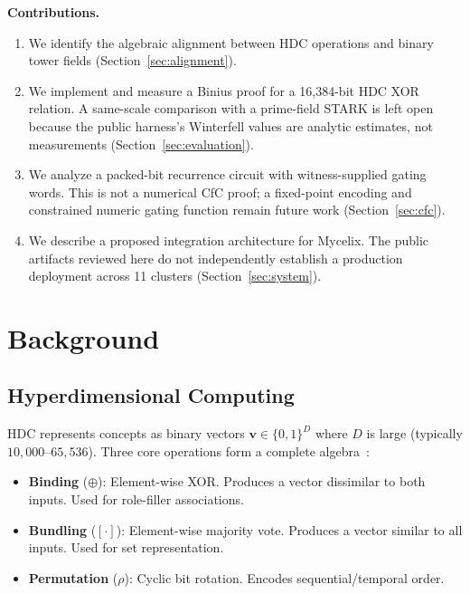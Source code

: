\documentclass[11pt,twocolumn]{article}
\begin{document}
\textbf{Contributions.}
\begin{enumerate}
    \item We identify the algebraic alignment between HDC operations and binary tower fields (Section~\ref{sec:alignment}).
    \item We implement and measure a Binius proof for a 16,384-bit HDC XOR relation. A same-scale comparison with a prime-field STARK is left open because the public harness's Winterfell values are analytic estimates, not measurements (Section~\ref{sec:evaluation}).
    \item We analyze a packed-bit recurrence circuit with witness-supplied gating words. This is not a numerical CfC proof; a fixed-point encoding and constrained numeric gating function remain future work (Section~\ref{sec:cfc}).
    \item We describe a proposed integration architecture for Mycelix. The public artifacts reviewed here do not independently establish a production deployment across 11 clusters (Section~\ref{sec:system}).
\end{enumerate}

\section{Background}

\subsection{Hyperdimensional Computing}

HDC represents concepts as binary vectors $\mathbf{v} \in \{0,1\}^D$ where $D$ is large (typically $10{,}000$--$65{,}536$). Three core operations form a complete algebra~\cite{plate1995holographic}:

\begin{itemize}
    \item \textbf{Binding} ($\oplus$): Element-wise XOR. Produces a vector dissimilar to both inputs. Used for role-filler associations.
    \item \textbf{Bundling} ($[\cdot]$): Element-wise majority vote. Produces a vector similar to all inputs. Used for set representation.
    \item \textbf{Permutation} ($\rho$): Cyclic bit rotation. Encodes sequential/temporal order.
\end{itemize}
\end{document}
